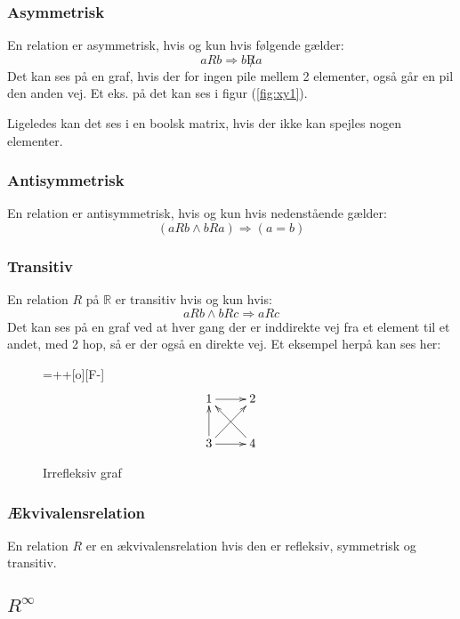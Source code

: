 \documentclass[a4paper]{article}
\begin{document}
    \subsubsection{Asymmetrisk}
    En relation er asymmetrisk, hvis og kun hvis følgende gælder:
    \begin{equation}
      aRb \Rightarrow b\not Ra
    \end{equation}
    Det kan ses på en graf, hvis der for ingen pile mellem 2 elementer, også går en pil den anden vej. Et eks. på det kan ses i figur (\ref{fig:xy1}).

    Ligeledes kan det ses i en boolsk matrix, hvis der ikke kan spejles nogen elementer.
    \subsubsection{Antisymmetrisk}
    En relation er antisymmetrisk, hvis og kun hvis nedenstående gælder:
    \begin{equation}
      (aRb \wedge bRa) \Rightarrow (a=b)
    \end{equation}

    \subsubsection{Transitiv}
    En relation $R$ på $\mathbb{R}$ er transitiv hvis og kun hvis:
    \begin{equation}
      aRb \wedge bRc \Rightarrow aRc
    \end{equation}
    Det kan ses på en graf ved at hver gang der er inddirekte vej fra et element til et andet, med 2 hop, så er der også en direkte vej. Et eksempel herpå kan ses her:
    \begin{figure}[H]
      \entrymodifiers={++[o][F-]}
      $$
      \xymatrix @-0pc {
        1 \ar[r] & 2 \\
        3 \ar[u] \ar[ru] \ar[r] &  4 \ar[ul] }
        $$
      \caption{Irrefleksiv graf} \label{fig:xy4}
    \end{figure}
    \subsubsection{Ækvivalensrelation}
      En relation $R$ er en ækvivalensrelation hvis den er refleksiv, symmetrisk og transitiv.
    \subsection{$R^\infty$}
\end{document}
